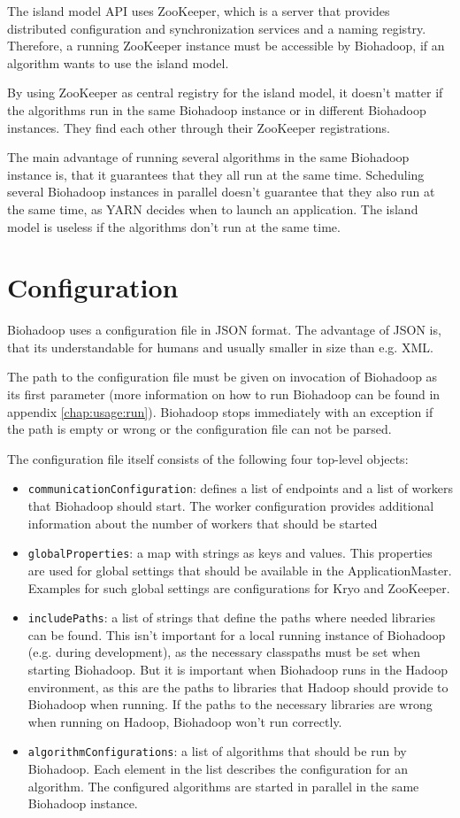 The island model API uses ZooKeeper, which is a server that provides distributed configuration and synchronization services and a naming registry. Therefore, a running ZooKeeper instance must be accessible by Biohadoop, if an algorithm wants to use the island model.

By using ZooKeeper as central registry for the island model, it doesn't matter if the algorithms run in the same Biohadoop instance or in different Biohadoop instances. They find each other through their ZooKeeper registrations.

The main advantage of running several algorithms in the same Biohadoop instance is, that it guarantees that they all run at the same time. Scheduling several Biohadoop instances in parallel doesn't guarantee that they also run at the same time, as YARN decides when to launch an application. The island model is useless if the algorithms don't run at the same time.

\section{Configuration}
\label{chap:impl:configuration}
Biohadoop uses a configuration file in JSON format. The advantage of JSON is, that its understandable for humans and usually smaller in size than e.g. XML.

The path to the configuration file must be given on invocation of Biohadoop as its first parameter (more information on how to run Biohadoop can be found in appendix \ref{chap:usage:run}). Biohadoop stops immediately with an exception if the path is empty or wrong or the configuration file can not be parsed.

The configuration file itself consists of the following four top-level objects:
\begin{itemize}
  \item \texttt{communicationConfiguration}: defines a list of endpoints and a list of workers that Biohadoop should start. The worker configuration provides additional information about the number of workers that should be started
  \item \texttt{globalProperties}: a map with strings as keys and values. This properties are used for global settings that should be available in the ApplicationMaster. Examples for such global settings are configurations for Kryo and ZooKeeper.
  \item \texttt{includePaths}: a list of strings that define the paths where needed libraries can be found. This isn't important for a local running instance of Biohadoop (e.g. during development), as the necessary classpaths must be set when starting Biohadoop. But it is important when Biohadoop runs in the Hadoop environment, as this are the paths to libraries that Hadoop should provide to Biohadoop when running. If the paths to the necessary libraries are wrong when running on Hadoop, Biohadoop won't run correctly.
  \item \texttt{algorithmConfigurations}: a list of algorithms that should be run by Biohadoop. Each element in the list describes the configuration for an algorithm. The configured algorithms are started in parallel in the same Biohadoop instance.
\end{itemize}

